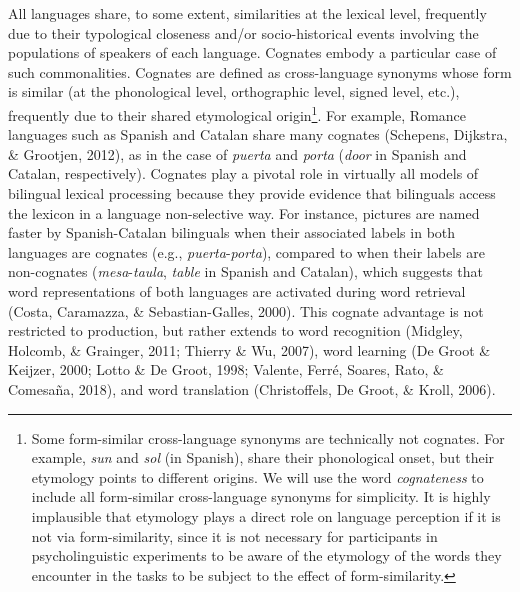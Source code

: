\documentclass[
  english,
  man,floatsintext]{apa6}
\begin{document}
All languages share, to some extent, similarities at the lexical level, frequently due to their typological closeness and/or socio-historical events involving the populations of speakers of each language. Cognates embody a particular case of such commonalities. Cognates are defined as cross-language synonyms whose form is similar (at the phonological level, orthographic level, signed level, etc.), frequently due to their shared etymological origin\footnote{Some form-similar cross-language synonyms are technically not cognates. For example, \emph{sun} and \emph{sol} (in Spanish), share their phonological onset, but their etymology points to different origins. We will use the word \emph{cognateness} to include all form-similar cross-language synonyms for simplicity. It is highly implausible that etymology plays a direct role on language perception if it is not via form-similarity, since it is not necessary for participants in psycholinguistic experiments to be aware of the etymology of the words they encounter in the tasks to be subject to the effect of form-similarity.}. For example, Romance languages such as Spanish and Catalan share many cognates (Schepens, Dijkstra, \& Grootjen, 2012), as in the case of \emph{puerta} and \emph{porta} (\emph{door} in Spanish and Catalan, respectively). Cognates play a pivotal role in virtually all models of bilingual lexical processing because they provide evidence that bilinguals access the lexicon in a language non-selective way. For instance, pictures are named faster by Spanish-Catalan bilinguals when their associated labels in both languages are cognates (e.g., \emph{puerta}-\emph{porta}), compared to when their labels are non-cognates (\emph{mesa}-\emph{taula}, \emph{table} in Spanish and Catalan), which suggests that word representations of both languages are activated during word retrieval (Costa, Caramazza, \& Sebastian-Galles, 2000). This cognate advantage is not restricted to production, but rather extends to word recognition (Midgley, Holcomb, \& Grainger, 2011; Thierry \& Wu, 2007), word learning (De Groot \& Keijzer, 2000; Lotto \& De Groot, 1998; Valente, Ferré, Soares, Rato, \& Comesaña, 2018), and word translation (Christoffels, De Groot, \& Kroll, 2006).
\end{document}
